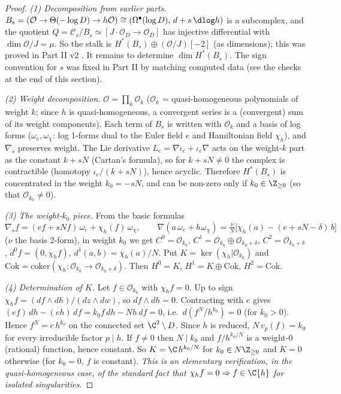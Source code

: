 \begin{proof}
\emph{(1) Decomposition from earlier parts.} $B_s=(\mathcal O\to\Theta(-\log D)\to h\mathcal O)\cong(\Omega^\bullet(\log D),\,d+s\,\dlog h)$ is a subcomplex, and the quotient $Q=\mathcal C_s/B_s\simeq[J\!\cdot\!\mathcal O_D\to\mathcal O_D]$ has injective differential with $\dim\mathcal O/J=\mu$. So the stalk is $H^*(B_s)\oplus(\mathcal O/J)[-2]$ (as dimensions); this was proved in Part II v2 \tP. It remains to determine $\dim H^*(B_s)$. The sign convention for $s$ was fixed in Part II by matching computed data (see the checks at the end of this section).

\emph{(2) Weight decomposition.} $\mathcal O=\prod_k\mathcal O_k$ ($\mathcal O_k$ = quasi-homogeneous polynomials of weight $k$; since $h$ is quasi-homogeneous, a convergent series is a (convergent) sum of its weight components). Each term of $B_s$ is written with $\mathcal O_k$ and a basis of log forms ($\omega_e,\omega_\chi$: log 1-forms dual to the Euler field $e$ and Hamiltonian field $\chi_h$), and $\nabla_s$ preserves weight. The Lie derivative $L_e=\nabla\iota_e+\iota_e\nabla$ acts on the weight-$k$ part as the constant $k+sN$ (Cartan's formula), so for $k+sN\ne0$ the complex is contractible (homotopy $\iota_e/(k+sN)$), hence acyclic. Therefore $H^*(B_s)$ is concentrated in the weight $k_0=-sN$, and can be non-zero only if $k_0\in\Z_{\ge0}$ (so that $\mathcal O_{k_0}\ne0$).

\emph{(3) The weight-$k_0$ piece.} From the basic formulas
\[\nabla_sf=(ef+sNf)\,\omega_e+\chi_h(f)\,\omega_\chi,\qquad\nabla(a\,\omega_e+b\,\omega_\chi)=\tfrac{\nu}{N}\bigl[\chi_h(a)-(e+sN-\delta)\,b\bigr]\]
($\nu$ the basis 2-form), in weight $k_0$ we get $C^0=\mathcal O_{k_0}$, $C^1=\mathcal O_{k_0}\oplus\mathcal O_{k_0+\delta}$, $C^2=\mathcal O_{k_0+\delta}$, $d^0f=(0,\chi_hf)$, $d^1(a,b)=\chi_h(a)/N$. Put $K=\ker(\chi_h|\mathcal O_{k_0})$ and $\mathrm{Cok}=\mathrm{coker}(\chi_h:\mathcal O_{k_0}\to\mathcal O_{k_0+\delta})$. Then $H^0=K$, $H^1=K\oplus\mathrm{Cok}$, $H^2=\mathrm{Cok}$.

\emph{(4) Determination of $K$.} Let $f\in\mathcal O_{k_0}$ with $\chi_hf=0$. Up to sign $\chi_hf=(df\wedge dh)/(dz\wedge dw)$, so $df\wedge dh=0$. Contracting with $e$ gives $(ef)\,dh-(eh)\,df=k_0f\,dh-Nh\,df=0$, i.e.\ $d(f^N/h^{k_0})=0$ (for $k_0>0$). Hence $f^N=c\,h^{k_0}$ on the connected set $\C^2\setminus D$. Since $h$ is reduced, $N\,v_p(f)=k_0$ for every irreducible factor $p\mid h$. If $f\ne0$ then $N\mid k_0$ and $f/h^{k_0/N}$ is a weight-$0$ (rational) function, hence constant. So $K=\C\,h^{k_0/N}$ for $k_0\in N\Z_{\ge0}$ and $K=0$ otherwise (for $k_0=0$, $f$ is constant). \emph{This is an elementary verification, in the quasi-homogeneous case, of the standard fact that $\chi_hf=0\Rightarrow f\in\C\{h\}$ for isolated singularities.}


\end{proof}
